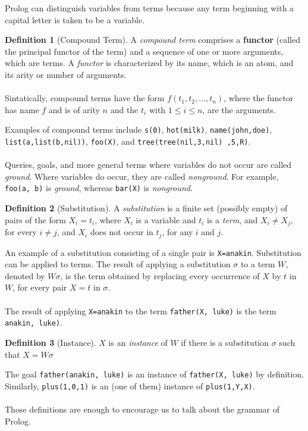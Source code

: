 \documentclass{report}
\theoremstyle{definition}
\theoremstyle{definition}
\newtheorem*{definition*}{Definition}
\newcommand{\ttt}[1]{\texttt{#1}}
\begin{document}
Prolog can distinguish variables from terms because any term beginning with a capital letter is taken to be a variable.
\begin{definition*}[Compound Term]
	A \textit{compound term} comprises a \textbf{functor} (called the principal functor of the term) and a sequence of one or more arguments, which are terms. A \textit{functor} is characterized by its name, which is an atom, and its arity or number of arguments.\\\\
	Sintatically, compound terms have the form $f(t_1, t_2, \ldots, t_n)$, where the functor has name $f$ and is of arity $n$ and the $t_i$ with $1 \leq i \leq n$, are the arguments.
\end{definition*}
Examples of compound terms include \ttt{s(0)}, \ttt{hot(milk)}, \ttt{name(john,doe)}, \ttt{list(a,list(b,nil))}, \ttt{foo(X)}, and \ttt{tree(tree(nil,3,nil) ,5,R)}.\\\\
Queries, goals, and more general terms where variables do not occur are called \textit{ground}. Where variables do occur, they are called \textit{nonground}. For example, \ttt{foo(a, b)} is \textit{ground}, whereas \ttt{bar(X)} is \textit{nonground}.
\begin{definition*}[Substitution]
	A \textit{substitution} is a finite set (possibly empty) of pairs of the form $X_i = t_i$, where $X_i$ is a variable and $t_i$ is a \textit{term}, and $X_i \neq X_j$, for every $i \neq j$, and $X_i$ does not occur in $t_j$, for any $i$ and $j$.
\end{definition*}
An example of a substitution consisting of a single pair is \ttt{X=anakin}. Substitution can be applied to terms. The result of applying a substitution $\sigma$  to a term $W$, denoted by $W \sigma$, is the term obtained by replacing every occurrence of $X$ by $t$ in $W$, for every pair $X=t$ in $\sigma$.\\\\
The result of applying \ttt{X=anakin} to the term \ttt{father(X, luke)} is the term \ttt{anakin, luke)}.
\begin{definition*}[Instance]
	$X$ is an \textit{instance} of $W$ if there is a substitution $\sigma$ such that $X = W \sigma$
\end{definition*}
The goal \ttt{father(anakin, luke)} is an instance of \ttt{father(X, luke)} by definition. Similarly, \ttt{plus(1,0,1)} is an (one of them) instance of \ttt{plus(1,Y,X)}.\\\\
Those definitions are enough to encourage us to talk about the grammar of Prolog.
\end{document}
